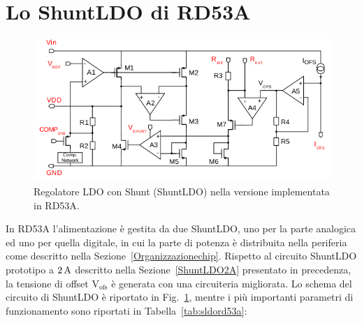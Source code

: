 \section{Lo ShuntLDO di RD53A}
\begin{figure}
\centering
\includegraphics[width=\textwidth]{Immagini/SLDO_RD53A}
\caption{Regolatore LDO con Shunt (ShuntLDO) nella versione implementata in RD53A.}
\label{SLDO_RD53A}
\end{figure}
In RD53A l'alimentazione è gestita da due ShuntLDO, uno per la parte analogica ed uno per quella digitale, in cui la parte di potenza \`e distribuita nella periferia come descritto nella Sezione~\ref{Organizzazionechip}. Rispetto al circuito ShuntLDO prototipo a $2\rm \, A$ descritto nella Sezione~\ref{ShuntLDO2A} presentato in precedenza, la tensione di offset $\mathrm{V_{ofs}}$ è generata con una circuiteria migliorata. Lo schema del circuito di ShuntLDO è riportato in Fig.~\ref{SLDO_RD53A}, mentre i pi\`u importanti parametri di funzionamento sono riportati in Tabella~\ref{tab:sldord53a}:

